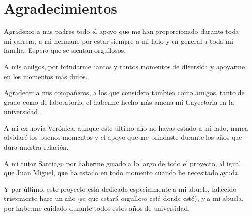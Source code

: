 \section*{Agradecimientos}

Agradezco a mis padres todo el apoyo que me han proporcionado durante toda mi carrera, a mi hermano por estar siempre a mi lado y en general a toda mi familia. Espero que se sientan orgullosos.

A mis amigos, por brindarme tantos y tantos momentos de diversión y apoyarme en los momentos más duros.

Agradecer a mis compañeros, a los que considero también como amigos, tanto de grado como de laboratorio, el haberme hecho más amena mi trayectoria en la universidad.

A mi ex-novia Verónica, aunque este último año no hayas estado a mi lado, nunca olvidaré los buenos momentos y el apoyo que me brindaste durante los años que duró nuestra relación.

A mi tutor Santiago por haberme guiado a lo largo de todo el proyecto, al igual que Juan Miguel, que ha estado en todo momento cuando he necesitado ayuda.

Y por último, este proyecto está dedicado especialmente a mi abuelo, fallecido tristemente hace un año (se que estará orgulloso esté donde esté), y a mi abuela, por haberme cuidado durante todos estos años de universidad.

\afterpage{\null\newpage}
\newpage
